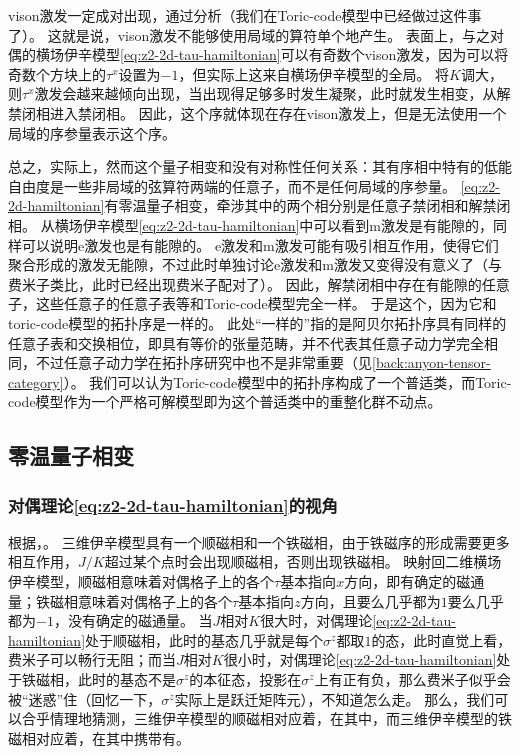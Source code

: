 vison激发一定成对出现，通过分析（我们在Toric-code模型中已经做过这件事了）。
这就是说，vison激发不能够使用局域的算符单个地产生。
表面上，与之对偶的横场伊辛模型\eqref{eq:z2-2d-tau-hamiltonian}可以有奇数个vison激发，因为可以将奇数个方块上的$\tau^x$设置为$-1$，但实际上这来自横场伊辛模型的全局。
将$K$调大，则$\tau^x$激发会越来越倾向出现，当出现得足够多时发生凝聚，此时就发生相变，从解禁闭相进入禁闭相。
因此，这个序就体现在存在vison激发上，但是无法使用一个局域的序参量表示这个序。

总之，实际上，然而这个量子相变和没有对称性任何关系：其有序相中特有的低能自由度是一些非局域的弦算符两端的任意子，而不是任何局域的序参量。
\eqref{eq:z2-2d-hamiltonian}有零温量子相变，牵涉其中的两个相分别是任意子禁闭相和解禁闭相。
从横场伊辛模型\eqref{eq:z2-2d-tau-hamiltonian}中可以看到m激发是有能隙的，同样可以说明e激发也是有能隙的。
e激发和m激发可能有吸引相互作用，使得它们聚合形成的激发无能隙，不过此时单独讨论e激发和m激发又变得没有意义了（与费米子类比，此时已经出现费米子配对了）。
因此，解禁闭相中存在有能隙的任意子，这些任意子的任意子表等和Toric-code模型完全一样。
于是这个，因为它和toric-code模型的拓扑序是一样的。
此处“一样的”指的是阿贝尔拓扑序具有同样的任意子表和交换相位，即具有等价的张量范畴，并不代表其任意子动力学完全相同，不过任意子动力学在拓扑序研究中也不是非常重要（见\autoref{back:anyon-tensor-category}）。
我们可以认为Toric-code模型中的拓扑序构成了一个普适类，而Toric-code模型作为一个严格可解模型即为这个普适类中的重整化群不动点。


\subsection{零温量子相变}\label{sec:z2-quantum-phase-transition}

\subsubsection{对偶理论\eqref{eq:z2-2d-tau-hamiltonian}的视角}

根据，。
三维伊辛模型具有一个顺磁相和一个铁磁相，由于铁磁序的形成需要更多相互作用，$J/K$超过某个点时会出现顺磁相，否则出现铁磁相。
映射回二维横场伊辛模型，顺磁相意味着对偶格子上的各个$\tau$基本指向$x$方向，即有确定的磁通量；铁磁相意味着对偶格子上的各个$\tau$基本指向$z$方向，且要么几乎都为$1$要么几乎都为$-1$，没有确定的磁通量。
当$J$相对$K$很大时，对偶理论\eqref{eq:z2-2d-tau-hamiltonian}处于顺磁相，此时的基态几乎就是每个$\sigma^z$都取$1$的态，此时直觉上看，费米子可以畅行无阻；而当$J$相对$K$很小时，对偶理论\eqref{eq:z2-2d-tau-hamiltonian}处于铁磁相，此时的基态不是$\sigma^z$的本征态，投影在$\sigma^z$上有正有负，那么费米子似乎会被“迷惑”住（回忆一下，$\sigma^z$实际上是跃迁矩阵元），不知道怎么走。
那么，我们可以合乎情理地猜测，三维伊辛模型的顺磁相对应着，在其中，而三维伊辛模型的铁磁相对应着，在其中携带有。


